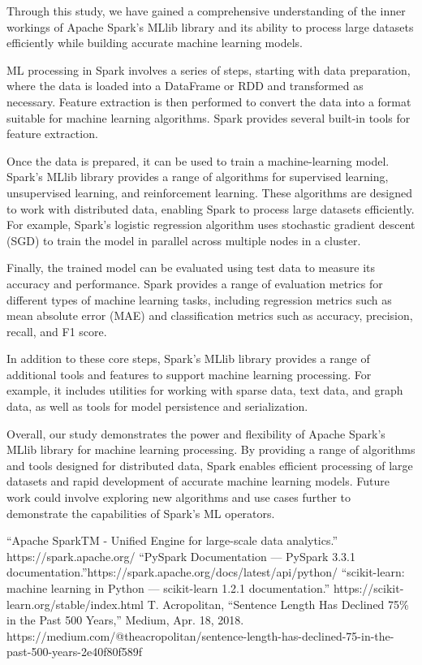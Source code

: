 \documentclass[conference]{IEEEtran}
\begin{document}
Through this study, we have gained a comprehensive understanding of the inner workings of Apache Spark's MLlib library and its ability to process large datasets efficiently while building accurate machine learning models.

ML processing in Spark involves a series of steps, starting with data preparation, where the data is loaded into a DataFrame or RDD and transformed as necessary. Feature extraction is then performed to convert the data into a format suitable for machine learning algorithms. Spark provides several built-in tools for feature extraction.

Once the data is prepared, it can be used to train a machine-learning model. Spark's MLlib library provides a range of algorithms for supervised learning, unsupervised learning, and reinforcement learning. These algorithms are designed to work with distributed data, enabling Spark to process large datasets efficiently. For example, Spark's logistic regression algorithm uses stochastic gradient descent (SGD) to train the model in parallel across multiple nodes in a cluster.


Finally, the trained model can be evaluated using test data to measure its accuracy and performance. Spark provides a range of evaluation metrics for different types of machine learning tasks, including regression metrics such as mean absolute error (MAE) and classification metrics such as accuracy, precision, recall, and F1 score.

In addition to these core steps, Spark's MLlib library provides a range of additional tools and features to support machine learning processing. For example, it includes utilities for working with sparse data, text data, and graph data, as well as tools for model persistence and serialization.

Overall, our study demonstrates the power and flexibility of Apache Spark's MLlib library for machine learning processing. By providing a range of algorithms and tools designed for distributed data, Spark enables efficient processing of large datasets and rapid development of accurate machine learning models. Future work could involve exploring new algorithms and use cases further to demonstrate the capabilities of Spark's ML operators.





\begin{thebibliography}{00}
 “Apache SparkTM - Unified Engine for large-scale data analytics.” https://spark.apache.org/
  “PySpark Documentation — PySpark 3.3.1 documentation.”https://spark.apache.org/docs/latest/api/python/
“scikit-learn: machine learning in Python — scikit-learn 1.2.1 documentation.” https://scikit-learn.org/stable/index.html
 T. Acropolitan, “Sentence Length Has Declined 75\% in the Past 500 Years,” Medium, Apr. 18, 2018. https://medium.com/@theacropolitan/sentence-length-has-declined-75-in-the-past-500-years-2e40f80f589f
\end{thebibliography}
\vspace{12pt}
\end{document}

